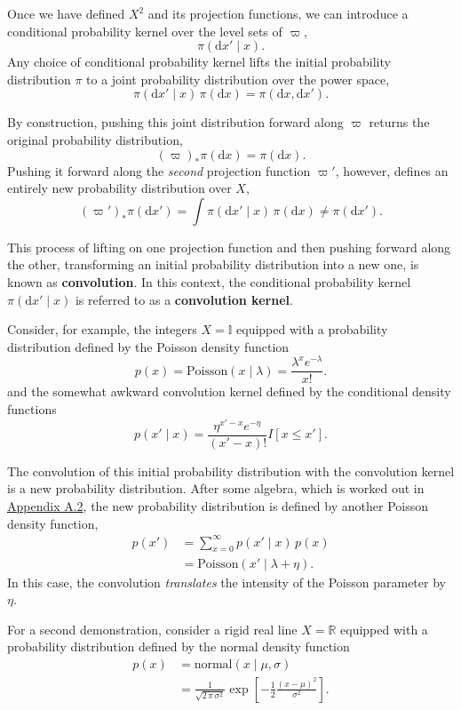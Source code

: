 \documentclass[
  letterpaper,
  DIV=11,
  numbers=noendperiod]{scrartcl}
\begin{document}
Once we have defined \(X^{2}\) and its projection functions, we can
introduce a conditional probability kernel over the level sets of
\(\varpi\), \[
\pi( \mathrm{d} x' \mid x ).
\] Any choice of conditional probability kernel lifts the initial
probability distribution \(\pi\) to a joint probability distribution
over the power space, \[
\pi( \mathrm{d} x' \mid x ) \, \pi( \mathrm{d} x )
=
\pi( \mathrm{d} x, \mathrm{d} x').
\]

By construction, pushing this joint distribution forward along
\(\varpi\) returns the original probability distribution, \[
(\varpi)_{*} \pi ( \mathrm{d} x )
=
\pi( \mathrm{d} x ).
\] Pushing it forward along the \emph{second} projection function
\(\varpi'\), however, defines an entirely new probability distribution
over \(X\), \[
(\varpi')_{*} \pi ( \mathrm{d} x' )
=
\int
\pi( \mathrm{d} x' \mid x ) \, \pi( \mathrm{d} x )
\ne
\pi( \mathrm{d} x' ).
\]

This process of lifting on one projection function and then pushing
forward along the other, transforming an initial probability
distribution into a new one, is known as \textbf{convolution}. In this
context, the conditional probability kernel
\(\pi( \mathrm{d} x' \mid x )\) is referred to as a \textbf{convolution
kernel}.

Consider, for example, the integers \(X = \mathbb{I}\) equipped with a
probability distribution defined by the Poisson density function \[
p( x )
= \text{Poisson}( x \mid \lambda )
= \frac{ \lambda^{x} e^{-\lambda} }{ x! }.
\] and the somewhat awkward convolution kernel defined by the
conditional density functions \[
p( x' \mid x )
=
\frac{ \eta^{x' - x} e^{-\eta} }{ (x' - x)! } I[ x \le x' ].
\]

The convolution of this initial probability distribution with the
convolution kernel is a new probability distribution. After some
algebra, which is worked out in \hyperref[sec:app2]{Appendix A.2}, the
new probability distribution is defined by another Poisson density
function, \begin{align*}
p ( x' )
&=
\sum_{x = 0}^{ \infty }
p( x' \mid x ) \, p (x)
\\
&=
\text{Poisson}( x' \mid \lambda + \eta ).
\end{align*} In this case, the convolution \emph{translates} the
intensity of the Poisson parameter by \(\eta\).

For a second demonstration, consider a rigid real line
\(X = \mathbb{R}\) equipped with a probability distribution defined by
the normal density function \begin{align*}
p( x )
&=
\text{normal} ( x \mid \mu, \sigma )
\\
&=
\frac{1}{ \sqrt{ 2 \, \pi \, \sigma^{2} } }
\exp \left[
  -\frac{1}{2} \frac{ ( x - \mu )^{2} }{ \sigma^{2} }
\right].
\end{align*}
\end{document}
